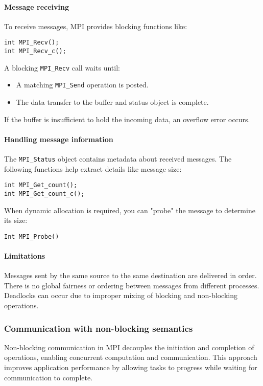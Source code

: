 \paragraph*{Message receiving}
To receive messages, MPI provides blocking functions like:
\begin{lstlisting}[style=C]
int MPI_Recv();
int MPI_Recv_c();    
\end{lstlisting}
A blocking \texttt{MPI\_Recv} call waits until:
\begin{itemize}
    \item A matching \texttt{MPI\_Send} operation is posted.
    \item The data transfer to the buffer and status object is complete.
\end{itemize}
If the buffer is insufficient to hold the incoming data, an overflow error occurs.

\paragraph*{Handling message information}
The \texttt{MPI\_Status} object contains metadata about received messages. 
The following functions help extract details like message size:
\begin{lstlisting}[style=C]
int MPI_Get_count();
int MPI_Get_count_c();
\end{lstlisting}
When dynamic allocation is required, you can "probe" the message to determine its size:
\begin{lstlisting}[style=C]
Int MPI_Probe()
\end{lstlisting}

\paragraph*{Limitations}
Messages sent by the same source to the same destination are delivered in order.
There is no global fairness or ordering between messages from different processes.
Deadlocks can occur due to improper mixing of blocking and non-blocking operations.

\subsubsection{Communication with non-blocking semantics}
Non-blocking communication in MPI decouples the initiation and completion of operations, enabling concurrent computation and communication. 
This approach improves application performance by allowing tasks to progress while waiting for communication to complete.

